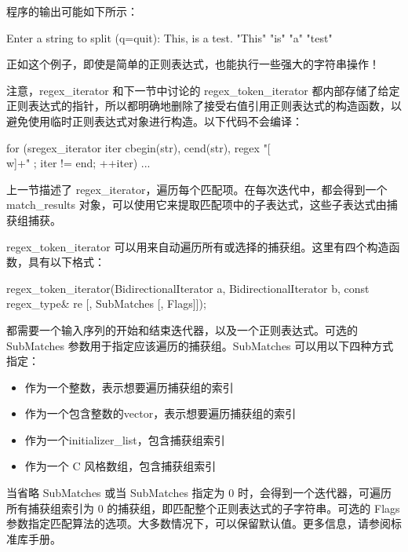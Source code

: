 程序的输出可能如下所示：

\begin{shell}
Enter a string to split (q=quit): This, is a test.
"This"
"is"
"a"
"test"
\end{shell}

正如这个例子，即使是简单的正则表达式，也能执行一些强大的字符串操作！

注意，regex\_iterator 和下一节中讨论的 regex\_token\_iterator 都内部存储了给定正则表达式的指针，所以都明确地删除了接受右值引用正则表达式的构造函数，以避免使用临时正则表达式对象进行构造。以下代码不会编译：

\begin{cpp}
for (sregex_iterator iter { cbegin(str), cend(str), regex { "[\\w]+" } };
    iter != end; ++iter) { ... }
\end{cpp}


上一节描述了 regex\_iterator，遍历每个匹配项。在每次迭代中，都会得到一个 match\_results 对象，可以使用它来提取匹配项中的子表达式，这些子表达式由捕获组捕获。

regex\_token\_iterator 可以用来自动遍历所有或选择的捕获组。这里有四个构造函数，具有以下格式：

\begin{cpp}
regex_token_iterator(BidirectionalIterator a,
                     BidirectionalIterator b,
                     const regex_type& re
                     [, SubMatches
                     [, Flags]]);
\end{cpp}

都需要一个输入序列的开始和结束迭代器，以及一个正则表达式。可选的 SubMatches 参数用于指定应该遍历的捕获组。SubMatches 可以用以下四种方式指定：

\begin{itemize}
\item
作为一个整数，表示想要遍历捕获组的索引

\item
作为一个包含整数的vector，表示想要遍历捕获组的索引

\item
作为一个initializer\_list，包含捕获组索引

\item
作为一个 C 风格数组，包含捕获组索引
\end{itemize}

当省略 SubMatches 或当 SubMatches 指定为 0 时，会得到一个迭代器，可遍历所有捕获组索引为 0 的捕获组，即匹配整个正则表达式的子字符串。可选的 Flags 参数指定匹配算法的选项。大多数情况下，可以保留默认值。更多信息，请参阅标准库手册。


